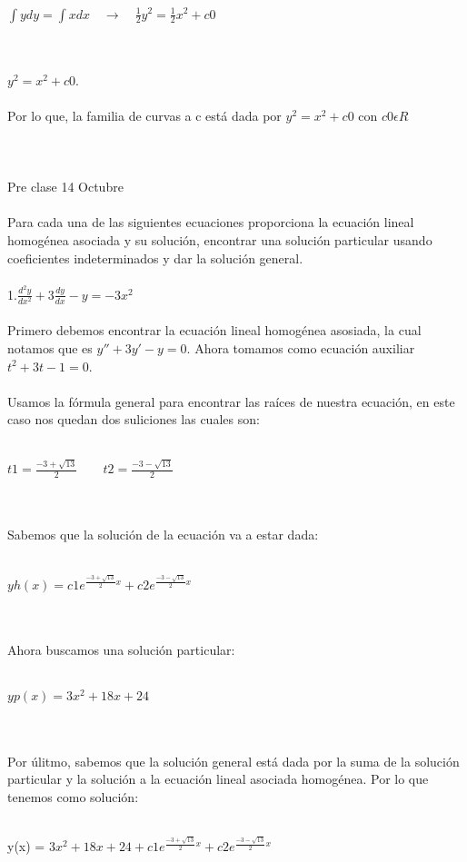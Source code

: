 \documentclass[a4paper,10pt]{article}
\begin{document}
\centerline{$\int y dy = \int x dx   \quad\rightarrow\quad \frac{1}{2} y^2 = \frac{1}{2} x^2  + c0$}\\\\
$y^2 = x^2 + c0$.\\\\
Por lo que, la familia de curvas a c está dada por $y^2 = x^2 + c0$  con $c0\epsilon R $\\\\\\\\
Pre clase 14 Octubre\\\\
Para cada una de las siguientes ecuaciones proporciona la ecuación
lineal homogénea asociada y su solución, encontrar una solución
particular usando coeficientes indeterminados y dar la solución
general.\\\\
1.$\frac{d^2y}{dx^2}+ 3 \frac{dy}{dx} - y = -3x^2$\\\\
Primero debemos encontrar la ecuación lineal homogénea asosiada, la cual notamos que es $y'' + 3y' - y=0 $. Ahora tomamos como ecuación auxiliar $t^2 + 3t - 1 =0$.\\\\
Usamos la fórmula general para encontrar las raíces de nuestra ecuación, en este caso nos quedan dos suliciones las cuales son:\\\\
\centerline{$t1= \frac{-3+  \sqrt{13}}{2} \quad\quad t2=\frac{-3-\sqrt{13}}{2}$ }\\\\
Sabemos que la solución de la ecuación va a estar dada:\\\\
\centerline{$yh(x)= c1 e^{\frac{-3+  \sqrt{13}}{2}x} + c2 e^{\frac{-3-\sqrt{13}}{2}x}$}\\\\
Ahora buscamos una solución particular:\\\\
\centerline{$yp(x)= 3x^2 + 18x +24$ }\\\\
Por úlitmo, sabemos que la solución general está dada por la suma de la solución particular y la solución a la ecuación lineal asociada homogénea. Por lo que tenemos como solución:\\\\
\centerline{y(x) = $3x^2 +18x +24 + c1 e^{\frac{-3+  \sqrt{13}}{2}x} +   c2 e^{\frac{-3-\sqrt{13}}{2}x}$}\\\\\\
\end{document}
